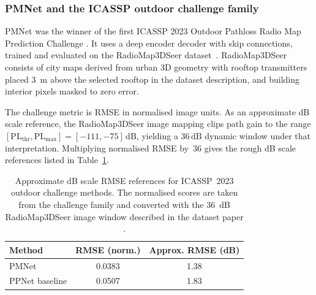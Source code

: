 \subsubsection{PMNet and the ICASSP outdoor challenge family}

PMNet \cite{pmnet_icassp2023} was the winner of the first ICASSP 2023 Outdoor Pathloss
Radio Map Prediction Challenge \cite{icassp2023challenge}.  It uses a deep
encoder decoder with skip connections, trained and evaluated on the
RadioMap3DSeer dataset~\cite{dataset2212}.  RadioMap3DSeer consists of
city maps derived from urban 3D geometry with rooftop transmitters placed
3~m above the selected rooftop in the dataset description, and building
interior pixels masked to zero error.

The challenge metric is RMSE in normalised image units.  As an approximate
dB scale reference, the RadioMap3DSeer image mapping clips path gain to the range
$[\mathrm{PL}_{\mathrm{thr}}, \mathrm{PL}_{\mathrm{max}}] = [-111, -75]\,\mathrm{dB}$,
yielding a $36\,\mathrm{dB}$ dynamic window under that interpretation.
Multiplying normalised RMSE by~36 gives the rough dB scale references listed in
Table~\ref{tab:icassp2023corrected}.

\begin{table}[ht]
\centering
\caption[Approximate ICASSP 2023 outdoor RMSE scale.]%
{Approximate dB scale RMSE references for ICASSP~2023 outdoor challenge methods.
The normalised scores are taken from the challenge family and converted with the
\SI{36}{dB} RadioMap3DSeer image window described in the dataset
paper \cite{icassp2023challenge,dataset2212}.\protect\footnotemark}
\label{tab:icassp2023corrected}
\begin{tabular}{lcc}
\toprule
\textbf{Method} & \textbf{RMSE (norm.)} & \textbf{Approx. RMSE (dB)} \\
\midrule
PMNet \cite{pmnet_icassp2023} & 0.0383 & 1.38 \\
PPNet baseline \cite{icassp2023challenge} & 0.0507 & 1.83 \\
\bottomrule
\end{tabular}
\end{table}


